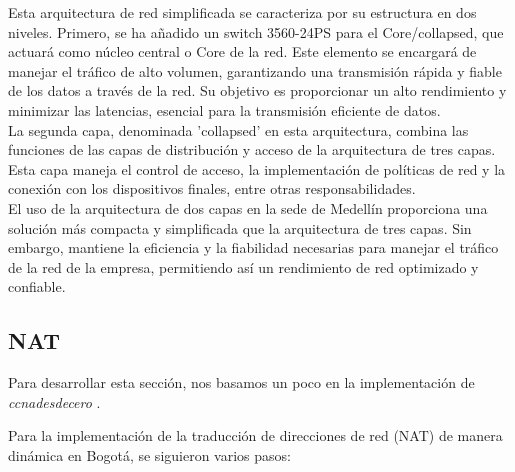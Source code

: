 Esta arquitectura de red simplificada se caracteriza por su estructura en dos
niveles. Primero, se ha añadido un switch 3560-24PS para el Core/collapsed, que actuará como núcleo central o Core de la red. Este elemento se encargará de manejar el tráfico de alto volumen, garantizando una transmisión rápida y fiable de los datos a través de la red. Su objetivo es proporcionar un alto rendimiento y minimizar las latencias, esencial para la transmisión eficiente de datos.
\\

La segunda capa, denominada 'collapsed' en esta arquitectura, combina las
funciones de las capas de distribución y acceso de la arquitectura de tres capas. Esta capa maneja el control de acceso, la implementación de políticas de red y la conexión con los dispositivos finales, entre otras responsabilidades.
\\

El uso de la arquitectura de dos capas en la sede de Medellín proporciona una
solución más compacta y simplificada que la arquitectura de tres capas. Sin embargo, mantiene la eficiencia y la fiabilidad necesarias para manejar el tráfico de la red de la empresa, permitiendo así un rendimiento de red optimizado y confiable.


\subsection{NAT}

Para desarrollar esta sección, nos basamos un poco en la implementación de
\textit{ccnadesdecero} \cite{ccnaNAT}.

Para la implementación de la traducción de direcciones de red (NAT) de manera dinámica en Bogotá, se siguieron varios pasos:

